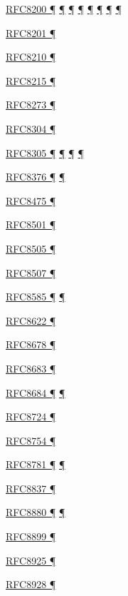 \documentclass[
]{article}
\begin{document}
\hyperref[how-to-keep-up-to-date]{RFC8200 ¶}
\hyperref[ipv6-basic-technology]{¶} \hyperref[address-resolution]{¶}
\hyperref[extension-headers-and-options]{¶} \hyperref[packet-format]{¶}
\hyperref[filtering]{¶} \hyperref[further-reading]{¶}
\hyperref[markdown-usage]{¶}

\hyperref[packet-size-and-jumbo-frames]{RFC8201 ¶}

\hyperref[filtering]{RFC8210 ¶}

\hyperref[translation-and-ipv4-as-a-service]{RFC8215 ¶}

\hyperref[prefix-per-host]{RFC8273 ¶}

\hyperref[transport-protocols]{RFC8304 ¶}

\hyperref[how-an-application-programmer-sees-ipv6]{RFC8305 ¶}
\hyperref[dual-stack-scenarios]{¶} \hyperref[multihoming]{¶}
\hyperref[deployment-in-the-home]{¶}

\hyperref[layer-2-functions]{RFC8376 ¶} \hyperref[energy-consumption]{¶}

\hyperref[multi-prefix-operation]{RFC8475 ¶}

\hyperref[dns]{RFC8501 ¶}

\hyperref[address-resolution]{RFC8505 ¶}

\hyperref[why-ipv6-is-so-complicated]{RFC8507 ¶}

\hyperref[routing]{RFC8585 ¶} \hyperref[dual-stack-scenarios]{¶}

\hyperref[traffic-class-and-flow-label]{RFC8622 ¶}

\hyperref[multi-prefix-operation]{RFC8678 ¶}

\hyperref[translation-and-ipv4-as-a-service]{RFC8683 ¶}

\hyperref[transport-protocols]{RFC8684 ¶} \hyperref[multihoming]{¶}

\hyperref[energy-consumption]{RFC8724 ¶}

\hyperref[extension-headers-and-options]{RFC8754 ¶}

\hyperref[obsolete-techniques]{RFC8781 ¶}
\hyperref[translation-and-ipv4-as-a-service]{¶}

\hyperref[traffic-class-and-flow-label]{RFC8837 ¶}

\hyperref[obsolete-techniques]{RFC8880 ¶}
\hyperref[translation-and-ipv4-as-a-service]{¶}

\hyperref[extension-headers-and-options]{RFC8899 ¶}

\hyperref[dual-stack-scenarios]{RFC8925 ¶}

\hyperref[address-resolution]{RFC8928 ¶}
\end{document}
